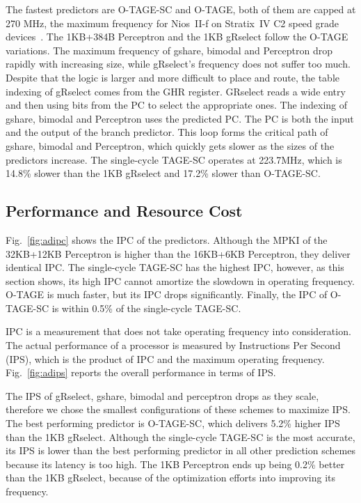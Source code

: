 The fastest predictors are \mbox{O-TAGE-SC} and \mbox{O-TAGE}, both of them are capped at 270 MHz, the maximum frequency for Nios~II-f on Stratix~IV C2 speed grade devices~\cite{niosfmax}. The 1KB+384B Perceptron and the 1KB gRselect follow the \mbox{O-TAGE} variations. The maximum frequency of gshare, bimodal and Perceptron drop rapidly with increasing size, while gRselect's frequency does not suffer too much. Despite that the logic is larger and more difficult to place and route,  the table indexing of gRselect comes from the GHR register. GRselect reads a wide entry and then using bits from the PC to select the appropriate ones. The indexing of gshare, bimodal and Perceptron uses  the predicted PC. The PC is both the input and the output of the branch predictor. This loop forms the critical path of gshare, bimodal and Perceptron, which quickly gets slower as the sizes of the predictors increase. The single-cycle \mbox{TAGE-SC} operates at 223.7MHz, which is 14.8\% slower than the 1KB gRselect and 17.2\% slower than \mbox{O-TAGE-SC}.

\subsection{Performance and Resource Cost}
\label{sec:eval:advanced:perf}
Fig.~\ref{fig:adipc} shows the IPC of the predictors. Although the MPKI of the 32KB+12KB Perceptron is higher than the 16KB+6KB Perceptron, they deliver identical IPC. The single-cycle \mbox{TAGE-SC} has the highest IPC, however, as this section shows, its high IPC cannot amortize the slowdown in operating frequency. \mbox{O-TAGE} is much faster, but its IPC drops significantly. Finally, the IPC of \mbox{O-TAGE-SC} is within 0.5\% of the single-cycle \mbox{TAGE-SC}.

IPC is a measurement that does not take operating frequency into consideration. The actual performance of a processor is measured by Instructions Per Second (IPS), which is the product of IPC and the maximum operating frequency. Fig.~\ref{fig:adips} reports the overall performance in terms of IPS.

The IPS of gRselect, gshare, bimodal and perceptron drops as they scale, therefore we chose the smallest configurations of these schemes to maximize IPS. The best performing predictor is \mbox{O-TAGE-SC}, which delivers 5.2\% higher IPS than the 1KB gRselect. Although the single-cycle \mbox{TAGE-SC} is the most accurate, its IPS is lower than the best performing predictor in all other prediction schemes  because its latency is too high. The 1KB Perceptron ends up being 0.2\% better than the 1KB gRselect, because of the optimization efforts into improving its frequency. 

